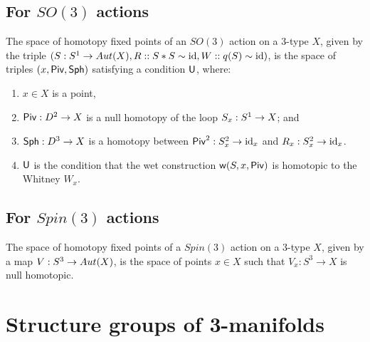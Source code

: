 \documentclass{amsart}
\begin{document}


\subsection{For $SO(3)$ actions}

\begin{theorem}
The space of homotopy fixed points of an $SO(3)$ action on a 3-type $X$, given by the triple $(S: S^1 \rightarrow Aut(X),R:: S \ast S \sim \mathrm{id},W:: q(S) \sim \mathrm{id})$, is the space of triples $(x, \mathsf{Piv}, \mathsf{Sph})$ satisfying a condition $\mathsf{U}$, where:
\begin{enumerate}
\item $x \in X$ is a point,
\item $\mathsf{Piv}: D^2 \rightarrow X$ is a null homotopy of the loop $S_x: S^1 \rightarrow X$; and
\item $\mathsf{Sph}: D^3 \rightarrow X$ is a homotopy between $\mathsf{Piv}^2 : S_x^2 \rightarrow \mathrm{id}_x$ and $R_x: S_x^2 \rightarrow \mathrm{id}_x$.
\item $\mathsf{U}$ is the condition that the wet construction $\mathsf{w}(S,x,\mathsf{Piv})$ is homotopic to the Whitney $W_x$.
\end{enumerate}
\end{theorem}

\subsection{For $Spin(3)$ actions} 

\begin{proposition}
The space of homotopy fixed points of a $Spin(3)$ action on a 3-type $X$, given by a map $V: S^3 \rightarrow Aut(X)$, is the space of points $x \in X$ such that $V_x : S^3 \to X$ is null homotopic.
\end{proposition}




\appendix
\renewcommand{\thetheorem}{A.\arabic{theorem}}
\setcounter{theorem}{0}


\section{Structure groups of 3-manifolds} \label{sec-lft-struc}

\end{document}
